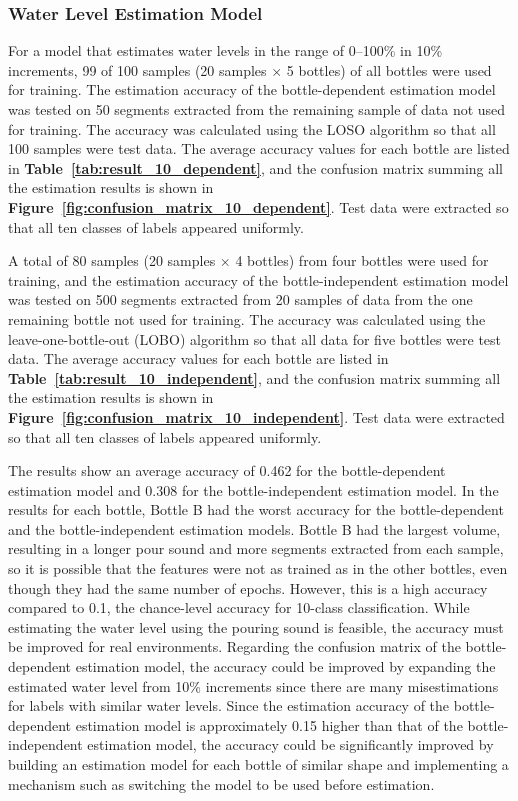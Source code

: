 \documentclass[sigconf]{acmart}
\newcommand\figref[1]{\textbf{Figure~\ref{fig:#1}}}
\newcommand\tabref[1]{\textbf{Table~\ref{tab:#1}}}
\begin{document}
\subsubsection{Water Level Estimation Model}
For a model that estimates water levels in the range of 0--100\% in 10\% increments, 99 of 100 samples (20 samples $\times$ 5 bottles) of all bottles were used for training. The estimation accuracy of the bottle-dependent estimation model was tested on 50 segments extracted from the remaining sample of data not used for training. The accuracy was calculated using the LOSO algorithm so that all 100 samples were test data. The average accuracy values for each bottle are listed in \tabref{result_10_dependent}, and the confusion matrix summing all the estimation results is shown in \figref{confusion_matrix_10_dependent}. Test data were extracted so that all ten classes of labels appeared uniformly.\par

A total of 80 samples (20 samples $\times$ 4 bottles) from four bottles were used for training, and the estimation accuracy of the bottle-independent estimation model was tested on 500 segments extracted from 20 samples of data from the one remaining bottle not used for training. The accuracy was calculated using the leave-one-bottle-out (LOBO) algorithm so that all data for five bottles were test data. The average accuracy values for each bottle are listed in \tabref{result_10_independent}, and the confusion matrix summing all the estimation results is shown in \figref{confusion_matrix_10_independent}. Test data were extracted so that all ten classes of labels appeared uniformly.\par

The results show an average accuracy of 0.462 for the bottle-dependent estimation model and 0.308 for the bottle-independent estimation model. In the results for each bottle, Bottle B had the worst accuracy for the bottle-dependent and the bottle-independent estimation models. Bottle B had the largest volume, resulting in a longer pour sound and more segments extracted from each sample, so it is possible that the features were not as trained as in the other bottles, even though they had the same number of epochs. However, this is a high accuracy compared to 0.1, the chance-level accuracy for 10-class classification. While estimating the water level using the pouring sound is feasible, the accuracy must be improved for real environments. Regarding the confusion matrix of the bottle-dependent estimation model, the accuracy could be improved by expanding the estimated water level from 10\% increments since there are many misestimations for labels with similar water levels. Since the estimation accuracy of the bottle-dependent estimation model is approximately 0.15 higher than that of the bottle-independent estimation model, the accuracy could be significantly improved by building an estimation model for each bottle of similar shape and implementing a mechanism such as switching the model to be used before estimation.
\end{document}
